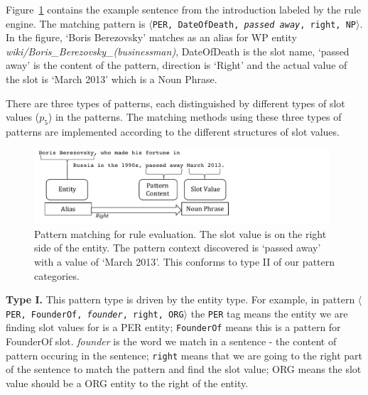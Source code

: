\documentclass[letterpaper]{article}
\begin{document}
Figure~\ref{fig:pattern} contains the example sentence from the introduction labeled by the rule engine. The matching pattern is $\langle$\texttt{PER, DateOfDeath, \textit{passed away}, right, NP}$\rangle$. In the figure, `Boris Berezovsky' matches as an alias for WP entity \textsl{wiki/Boris\_Berezovsky\_(businessman)}, DateOfDeath is the slot name, `passed away' is the content of the pattern, direction is `Right' and the actual value of the slot is `March 2013' which is a Noun Phrase.

There are three types of patterns, each distinguished by different types of slot values ($p_5$) in the patterns.
The matching methods using these three types of patterns are implemented according to the different structures of slot values.

\begin{figure}
\centering
\includegraphics[width = 11cm]{./images/Pattern-crop.pdf}
\caption{Pattern matching for rule evaluation. The slot value is on the right side of the 
entity. The pattern context discovered is `passed away' with a value of `March 2013'. This conforms to type II of our pattern categories.}\label{fig:pattern}
\end{figure}
 
\textbf{Type I.} This pattern type is driven by the entity type.
For example, in pattern $\langle$\texttt{PER, FounderOf, \textit{founder}, right, ORG}$\rangle$ the \texttt{PER} 
tag means the entity we are finding slot values for is a PER entity;
\texttt{FounderOf} means this is a pattern for FounderOf slot.
\textit{founder} is the word we match in a sentence - the content of pattern occuring in the sentence;
\texttt{right} means that we are going to the right part of the sentence to match the pattern and find the slot value;
ORG means the slot value should be a ORG entity to the right of the entity.
\end{document}

